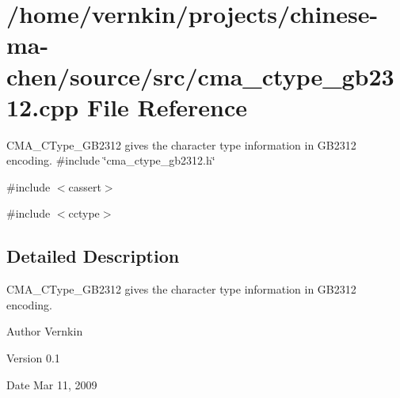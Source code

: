 \section{/home/vernkin/projects/chinese-\/ma-\/chen/source/src/cma\_\-ctype\_\-gb2312.cpp File Reference}
\label{cma__ctype__gb2312_8cpp}


CMA\_\-CType\_\-GB2312 gives the character type information in GB2312 encoding.  
{\ttfamily \#include \char`\"{}cma\_\-ctype\_\-gb2312.h\char`\"{}}\par
{\ttfamily \#include $<$cassert$>$}\par
{\ttfamily \#include $<$cctype$>$}\par


\subsection{Detailed Description}
CMA\_\-CType\_\-GB2312 gives the character type information in GB2312 encoding. \begin{DoxyAuthor}{Author}
Vernkin 
\end{DoxyAuthor}
\begin{DoxyVersion}{Version}
0.1 
\end{DoxyVersion}
\begin{DoxyDate}{Date}
Mar 11, 2009 
\end{DoxyDate}
